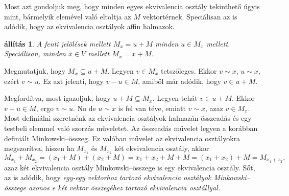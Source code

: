 \documentclass[9pt, showtrims]{memoir}
\makeatletter
\renewenvironment{proof}[1][\proofname]
    {\par\pushQED{\qed}%
    \normalfont \topsep6\p@\@plus6\p@\relax
    \trivlist
    \item[\hskip\labelsep
        \itshape
    #1\@addpunct{:}]\ignorespaces}
    {\popQED\endtrivlist\@endpefalse}
\theoremstyle{plain}
\newtheorem{proposition}{állítás}[section]
\theoremstyle{remark}
\theoremstyle{definition}
\makeatother
\begin{document}
    Most azt gondoljuk meg, hogy minden egyes ekvivalencia osztály tekinthető úgyis mint,
    bármelyik elemével való eltoltja az $M$ vektortérnek.
    Speciálisan az is adódik, 
    hogy az ekvivalencia osztályok affin halmazok.
    \begin{proposition}
        A fenti jelölések mellett $M_x=u+M$ minden $u\in M_x$ mellett.
        Speciálisan, minden $x\in V$ mellett $M_x=x+M$.
    \end{proposition}
    \begin{proof}
        Megmutatjuk, hogy $M_x\subseteq u+M$.
        Legyen $v\in M_x$ tetszőleges.
        Ekkor $v\sim x$, $u\sim x$, ezért $v\sim u$.
        Ez azt jelenti, hogy $v-u\in M$, amiből már adódik, 
        hogy $v\in u+M$.

        Megfordítva, most igazoljuk, hogy $u+M\subseteq M_x$.
        Legyen tehát $v\in u+M$.
        Ekkor $v-u\in M$, ergo $v\sim u$.
        No de $u\sim x$ is fel van téve, 
        emiatt $v\sim x$, azaz $v\in M_x$.
    \end{proof}
    Most definiálni szeretnénk az ekvivalencia osztályok halmazán összeadás és egy testbeli elemmel való
    szorzás műveletet.
    Az összeadás művelet legyen a korábban definiált Minkowski--összeg.
    Ez valóban művelet az ekvivalencia osztályokra megszorítva, 
    hiszen ha $M_{x_1}$ és $M_{x_2}$ két ekvivalencia osztály,
    akkor
    \[
        M_{x_1}+M_{x_2}=\left( x_1+M \right)+\left( x_2+M \right)
        =
        x_1+x_2+M+M=
        \left( x_1+x_2 \right)+M
        =
        M_{x_1+x_2},\tag{\dag}
    \]
    azaz két ekvivalencia osztály Minkowski--összege is egy ekvivalencia osztály.
    Sőt, az is adódik, hogy 
    \emph{
        egy-egy vektorhoz tartozó ekvivalencia osztályok Minkowski--összege
        azonos e két vektor összegéhez tartozó ekvivalencia osztállyal.}
\end{document}

